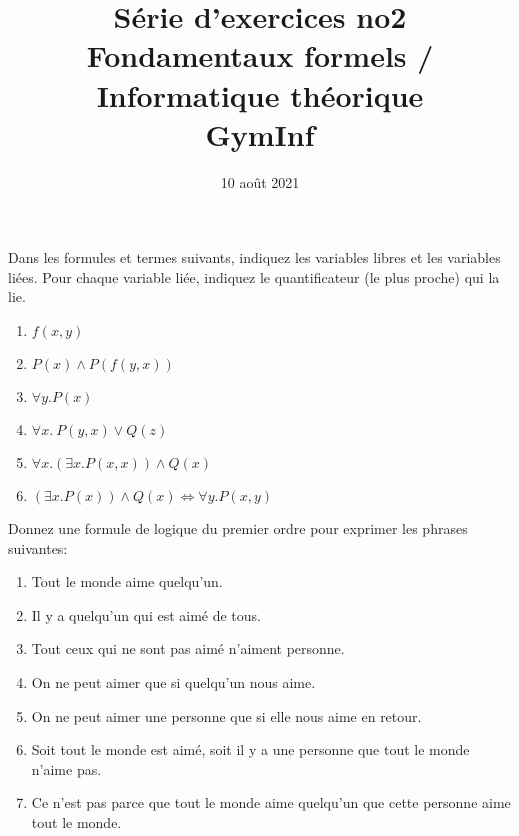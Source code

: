 \documentclass[12pt,french,a4paper]{article}
\begin{document}
\title{\vspace{-2cm}Série d'exercices no2\\\large{Fondamentaux formels / Informatique théorique\\GymInf}}
\date{\vspace{-1cm}10 août 2021}

\maketitle

\begin{question}

Dans les formules et termes suivants, indiquez les variables libres et les variables liées.
Pour chaque variable liée, indiquez le quantificateur (le plus proche) qui la lie.

\begin{enumerate}
\item $f(x, y)$
\item $P(x) \wedge P(f(y, x))$
\item $\forall y. P(x)$
\item $\forall x.\ P(y, x) \vee Q(z)$
\item $\forall x. (\exists x. P(x, x)) \wedge Q(x)$
\item $(\exists x. P(x)) \wedge Q(x) \iff \forall y. P(x, y)$
\end{enumerate}


\end{question}

\begin{question}

Donnez une formule de logique du premier ordre pour exprimer les phrases suivantes:
\begin{enumerate}
\item Tout le monde aime quelqu'un.
\item Il y a quelqu'un qui est aimé de tous.
\item Tout ceux qui ne sont pas aimé n'aiment personne.
\item On ne peut aimer que si quelqu'un nous aime.
\item On ne peut aimer une personne que si elle nous aime en retour.
\item Soit tout le monde est aimé, soit il y a une personne que tout le monde n'aime pas.
\item Ce n'est pas parce que tout le monde aime quelqu'un que cette personne aime tout le monde.
\end{enumerate}
\end{question}
\end{document}
